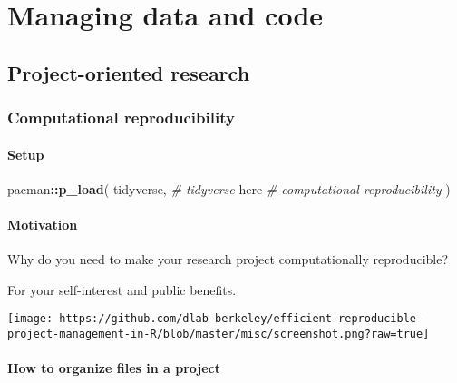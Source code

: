 \documentclass[
]{book}
\newenvironment{Shaded}{\begin{snugshade}}{\end{snugshade}}
\newcommand{\CommentTok}[1]{\textcolor[rgb]{0.56,0.35,0.01}{\textit{#1}}}
\newcommand{\KeywordTok}[1]{\textcolor[rgb]{0.13,0.29,0.53}{\textbf{#1}}}
\newcommand{\NormalTok}[1]{#1}
\newcommand{\OperatorTok}[1]{\textcolor[rgb]{0.81,0.36,0.00}{\textbf{#1}}}
\begin{document}
\hypertarget{intro}{%
\chapter{Managing data and code}\label{intro}}

\hypertarget{project-oriented-research}{%
\section{Project-oriented research}\label{project-oriented-research}}

\hypertarget{computational-reproducibility}{%
\subsection{Computational reproducibility}\label{computational-reproducibility}}

\hypertarget{setup}{%
\subsubsection{Setup}\label{setup}}

\begin{Shaded}
\begin{Highlighting}[]
\NormalTok{pacman}\OperatorTok{::}\KeywordTok{p\_load}\NormalTok{(}
\NormalTok{  tidyverse, }\CommentTok{\# tidyverse}
\NormalTok{  here }\CommentTok{\# computational reproducibility}
\NormalTok{)}
\end{Highlighting}
\end{Shaded}

\hypertarget{motivation}{%
\subsubsection{Motivation}\label{motivation}}

Why do you need to make your research project computationally reproducible?

For your self-interest and public benefits.

\texttt{[image: https://github.com/dlab-berkeley/efficient-reproducible-project-management-in-R/blob/master/misc/screenshot.png?raw=true]}

\hypertarget{how-to-organize-files-in-a-project}{%
\subsubsection{How to organize files in a project}\label{how-to-organize-files-in-a-project}}
\end{document}

